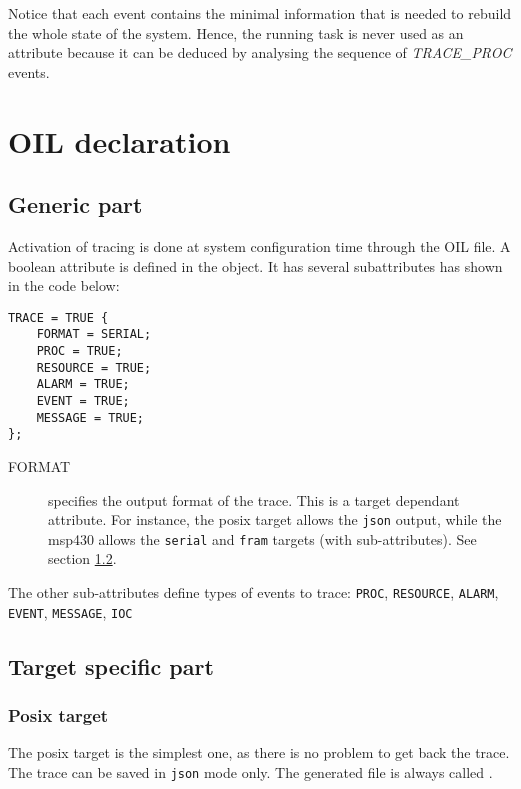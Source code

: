 Notice that each event contains the minimal information that is needed
to rebuild the whole state of the system.
Hence, the running task is never used as an attribute because it can be deduced
by analysing the sequence of \emph{TRACE\_PROC} events.

\section{OIL declaration}
\subsection{Generic part}

Activation of tracing is done at system configuration time through the OIL file.
A boolean attribute  is defined in the  object. It has
several subattributes has shown in the code below:

\begin{lstlisting}[language=OIL]
TRACE = TRUE {
    FORMAT = SERIAL;
    PROC = TRUE;
    RESOURCE = TRUE;
    ALARM = TRUE;
    EVENT = TRUE;
    MESSAGE = TRUE;
};
\end{lstlisting}

\begin{description}
	\item[FORMAT] specifies the output format of the trace. This is a target dependant attribute. For instance, the posix target allows the \texttt{json} output, while the msp430 allows the \texttt{serial} and \texttt{fram} targets (with sub-attributes). See section \ref{sec:traceTargetFormat}.

\end{description}
The other sub-attributes define types of events to trace: \texttt{PROC}, \texttt{RESOURCE}, \texttt{ALARM}, \texttt{EVENT}, \texttt{MESSAGE}, \texttt{IOC}

\subsection{Target specific part}
\label{sec:traceTargetFormat}
\subsubsection{Posix target}
The posix target is the simplest one, as there is no problem to get back the trace. The trace can be saved in \texttt{json} mode only. The generated file is always called .


